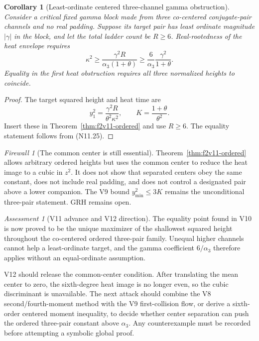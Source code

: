 \documentclass[11pt]{article}
\newtheorem{corollary}[theorem]{Corollary}
\theoremstyle{definition}
\theoremstyle{remark}
\newtheorem{assessment}[theorem]{Assessment}
\newtheorem{firewall}[theorem]{Firewall}
\newcommand{\abs}[1]{\left\lvert #1\right\rvert}
\begin{document}
\begin{corollary}[Least-ordinate centered three-channel gamma obstruction]
\label{cor:f2v11-gamma}
Consider a critical fixed gamma block made from three co-centered
conjugate-pair channels and no real padding.  Suppose its target pair has
least ordinate magnitude \(\abs{\gamma}\) in the block, and let the total
ladder count be \(R\ge6\).  Real-rootedness of the heat envelope requires
\[
 \boxed{
 \kappa^2\ge
 \frac{\gamma^2R}{\alpha_3(1+\theta)}
 \ge
 \frac6{\alpha_3}\frac{\gamma^2}{1+\theta}.}
 \tag{N11.28}
\]
Equality in the first heat obstruction requires all three normalized
heights to coincide.
\end{corollary}

\begin{proof}
The target squared height and heat time are
\[
 y_1^2=\frac{\gamma^2R}{\theta^2\kappa^2},
 \qquad
 K=\frac{1+\theta}{\theta^2}.
 \tag{N11.29}
\]
Insert these in Theorem~\ref{thm:f2v11-ordered} and use \(R\ge6\).
The equality statement follows from \textup{(N11.25)}.
\end{proof}

\begin{firewall}[The common center is still essential]
Theorem~\ref{thm:f2v11-ordered} allows arbitrary ordered heights but uses
the common center to reduce the heat image to a cubic in \(z^2\).  It does
not show that separated centers obey the same constant, does not include
real padding, and does not control a designated pair above a lower
companion.  The V9 bound \(y_{\min}^2\le3K\) remains the unconditional
three-pair statement.  GRH remains open.
\end{firewall}

\begin{assessment}[V11 advance and V12 direction]
The equality point found in V10 is now proved to be the unique maximizer of
the shallowest squared height throughout the co-centered ordered
three-pair family.  Unequal higher channels cannot help a least-ordinate
target, and the gamma coefficient \(6/\alpha_3\) therefore applies without
an equal-ordinate assumption.

V12 should release the common-center condition.  After translating the
mean center to zero, the sixth-degree heat image is no longer even, so the
cubic discriminant is unavailable.  The next attack should combine the V8
second/fourth-moment method with the V9 first-collision flow, or derive a
sixth-order centered moment inequality, to decide whether center
separation can push the ordered three-pair constant above \(\alpha_3\).
Any counterexample must be recorded before attempting a symbolic global
proof.
\end{assessment}
\end{document}
